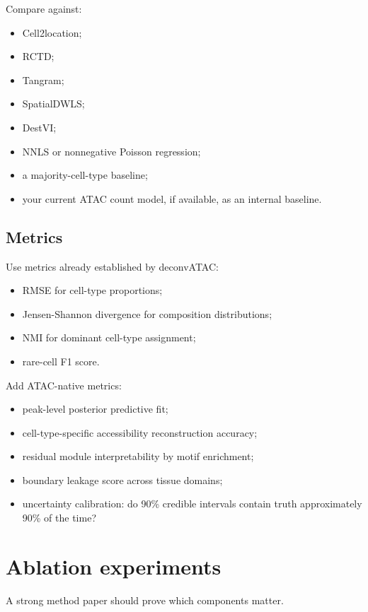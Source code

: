 \documentclass[11pt]{article}
\begin{document}
Compare against:
\begin{itemize}
    \item Cell2location;
    \item RCTD;
    \item Tangram;
    \item SpatialDWLS;
    \item DestVI;
    \item NNLS or nonnegative Poisson regression;
    \item a majority-cell-type baseline;
    \item your current ATAC count model, if available, as an internal baseline.
\end{itemize}

\subsection{Metrics}

Use metrics already established by deconvATAC:
\begin{itemize}
    \item RMSE for cell-type proportions;
    \item Jensen-Shannon divergence for composition distributions;
    \item NMI for dominant cell-type assignment;
    \item rare-cell F1 score.
\end{itemize}

Add ATAC-native metrics:
\begin{itemize}
    \item peak-level posterior predictive fit;
    \item cell-type-specific accessibility reconstruction accuracy;
    \item residual module interpretability by motif enrichment;
    \item boundary leakage score across tissue domains;
    \item uncertainty calibration: do 90\% credible intervals contain truth approximately 90\% of the time?
\end{itemize}

\section{Ablation experiments}

A strong method paper should prove which components matter.
\end{document}

